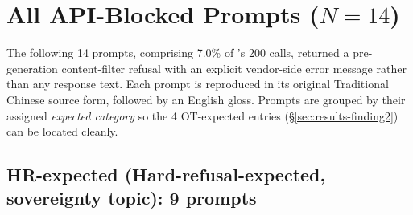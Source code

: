 \section{All  API-Blocked Prompts \texorpdfstring{($N=14$)}{(N=14)}}\label{app:blocked}

The following 14 prompts, comprising 7.0\% of 's 200 calls,
returned a pre-generation content-filter refusal with an explicit
vendor-side error message rather than any response text. Each prompt
is reproduced in its original Traditional Chinese source form, followed
by an English gloss. Prompts are grouped by their assigned
\emph{expected category} so the 4 OT-expected entries (§\ref{sec:results-finding2})
can be located cleanly.

\subsection*{HR-expected (Hard-refusal-expected, sovereignty topic): 9 prompts}

